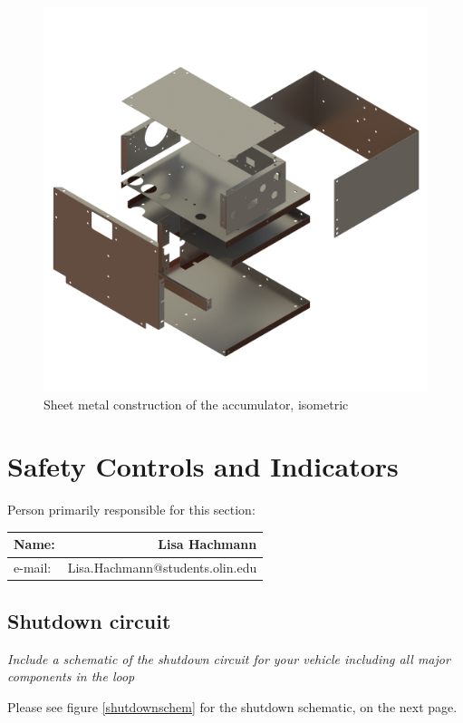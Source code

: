 \documentclass{article}
\begin{document}
\begin{figure}[H]
    \centering
    \includegraphics[width = 0.7 \textwidth]{sheetmetal_isoview}
    \caption{Sheet metal construction of the accumulator, isometric}
    \label{acc_sheet_iso}
\end{figure}

\section{Safety Controls and Indicators}

Person primarily responsible for this section:
    \begin{table}[H]
        \centering
        \label{responsible6}
        \begin{tabular}{lr}
        Name: & Lisa Hachmann \\ \hline
        e-mail: & Lisa.Hachmann@students.olin.edu \\ \hline
        \end{tabular}
    \end{table}

\subsection{Shutdown circuit}

\textit{Include a schematic of the shutdown circuit for your vehicle including all major components in the loop}

Please see figure \ref{shutdownschem} for the shutdown schematic, on the next page.
\end{document}
